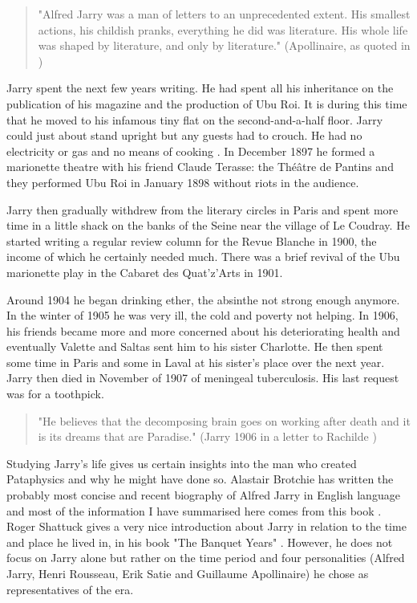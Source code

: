 \begin{quote}
  "Alfred Jarry was a man of letters to an unprecedented extent. His smallest actions, his childish pranks, everything he did was literature. His whole life was shaped by literature, and only by literature." (Apollinaire, as quoted in \citep[p.307]{Brotchie2011})
\end{quote}

Jarry spent the next few years writing. He had spent all his inheritance on the publication of his magazine and the production of Ubu Roi. It is during this time that he moved to his infamous tiny flat on the second-and-a-half floor. Jarry could just about stand upright but any guests had to crouch. He had no electricity or gas and no means of cooking \citep[p.195]{Brotchie2011}. In December 1897 he formed a marionette theatre with his friend Claude Terasse: the Théâtre de Pantins and they performed Ubu Roi in January 1898 without riots in the audience.

Jarry then gradually withdrew from the literary circles in Paris and spent more time in a little shack on the banks of the Seine near the village of Le Coudray. He started writing a regular review column for the Revue Blanche in 1900, the income of which he certainly needed much. There was a brief revival of the Ubu marionette play in the Cabaret des Quat'z'Arts in 1901.

Around 1904 he began drinking ether, the absinthe not strong enough anymore. In the winter of 1905 he was very ill, the cold and poverty not helping. In 1906, his friends became more and more concerned about his deteriorating health and eventually Valette and Saltas sent him to his sister Charlotte. He then spent some time in Paris and some in Laval at his sister's place over the next year. Jarry then died in November of 1907 of meningeal tuberculosis. His last request was for a toothpick.

\begin{quote}
  "He believes that the decomposing brain goes on working after death and it is its dreams that are Paradise." (Jarry 1906 in a letter to Rachilde \citep{Brotchie2007})
\end{quote}

Studying Jarry's life gives us certain insights into the man who created Pataphysics and why he might have done so. Alastair Brotchie has written the probably most concise and recent biography of Alfred Jarry in English language and most of the information I have summarised here comes from this book \citep{Brotchie2011}. Roger Shattuck gives a very nice introduction about Jarry in relation to the time and place he lived in, in his book "The Banquet Years" \citep{Shattuck1959}. However, he does not focus on Jarry alone but rather on the time period and four personalities (Alfred Jarry, Henri Rousseau, Erik Satie and Guillaume Apollinaire) he chose as representatives of the era.


